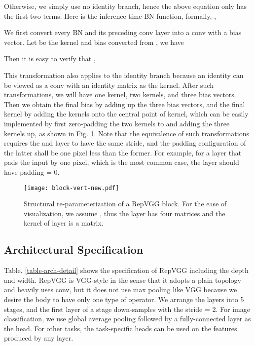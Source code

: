 \documentclass[final]{cvpr}
\begin{document}
Otherwise, we simply use no identity branch, hence the above equation only has the first two terms. Here  is the inference-time BN function, formally, ,


We first convert every BN and its preceding conv layer into a conv with a bias vector. Let  be the kernel and bias converted from , we have


Then it is easy to verify that ,


This transformation also applies to the identity branch because an identity can be viewed as a  conv with an identity matrix as the kernel. After such transformations, we will have one  kernel, two  kernels, and three bias vectors. Then we obtain the final bias by adding up the three bias vectors, and the final  kernel by adding the  kernels onto the central point of  kernel, which can be easily implemented by first zero-padding the two  kernels to  and adding the three kernels up, as shown in Fig. \ref{fig-transform}. Note that the equivalence of such transformations requires the  and  layer to have the same stride, and the padding configuration of the latter shall be one pixel less than the former. For example, for a  layer that pads the input by one pixel, which is the most common case, the  layer should have padding = 0. 

\begin{figure}
	\begin{center}
		\texttt{[image: block-vert-new.pdf]}
		\vspace{-0.25in}
		\caption{Structural re-parameterization of a RepVGG block. For the ease of visualization, we assume , thus the  layer has four  matrices and the kernel of  layer is a  matrix.}
		\label{fig-transform}
	\end{center}
	\vspace{-0.25in}
\end{figure}

\subsection{Architectural Specification}

Table. \ref{table-arch-detail} shows the specification of RepVGG including the depth and width. RepVGG is VGG-style in the sense that it adopts a plain topology and heavily uses  conv, but it does not use max pooling like VGG because we desire the body to have only one type of operator. We arrange the  layers into 5 stages, and the first layer of a stage down-samples with the stride = 2. For image classification, we use global average pooling followed by a fully-connected layer as the head. For other tasks, the task-specific heads can be used on the features produced by any layer.
\end{document}
